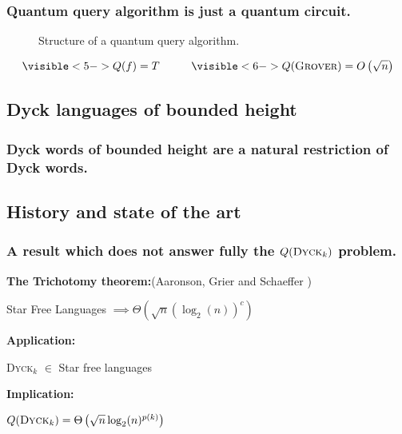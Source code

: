 \documentclass[9pt, notheorems]{beamer}
\newcommand{\Dyck}[1]{\textsc{Dyck$_{#1}$}}
\renewcommand{\comment}[1]{}
\theoremstyle{definition}
\theoremstyle{plain}
\theoremstyle{definition}
\begin{document}
\begin{frame}
    \frametitle{Quantum query algorithm is just a quantum circuit.}
    \begin{figure}
        \centering

        
        \caption{Structure of a quantum query algorithm.}
        \label{fig:quantum_query_algorithm_structure}
    \end{figure}
    {\Huge \[\visible<5->{Q(f)=T} \hspace*{1cm} \visible<6->{Q(\textsc{Grover})=O\left(\sqrt{n}\right)} \]}
\end{frame}

\subsection{Dyck languages of bounded height}

\begin{frame}
    \frametitle{Dyck words of bounded height are a natural restriction of Dyck words.}
    \begin{figure}
        
    \end{figure}
    \visible<9>{
        {\Huge \[\Dyck{k}\]}}
\end{frame}

\subsection{History and state of the art}

\begin{frame}
    \frametitle{A result which does not answer fully the $Q(\Dyck{k})$ problem.}
    \vfill
    \textbf{The Trichotomy theorem:}(Aaronson,
    Grier and Schaeffer \cite[2019]{trichotomy_not_andris})
    \begin{center}
        {\huge Star Free Languages $\implies \Theta\left(\sqrt{n}(\log_2(n))^c\right)$ }\\
    \end{center}
    \vfill
    \pause
    \textbf{Application:}
    \begin{center}
        {\huge \Dyck{k} $\in$ Star free languages}
    \end{center}
    \pause
    \vfill
    \textbf{Implication:}
    \begin{center}
        {\huge $\comment{\exists p, }Q(\Dyck{k})=\Theta \left(\sqrt{n}\log_2(n)^{p(k)}\right)$}
    \end{center}
    \vfill
\end{frame}
\end{document}
